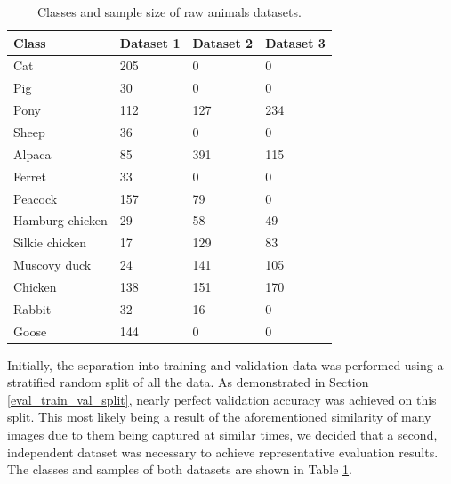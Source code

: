 \documentclass{l4proj}
\begin{document}
\begin{table}[ht]
  \centering
  \begin{tabular}{@{}llll@{}}
    \toprule
    \textbf{Class}  & \textbf{Dataset 1} & \textbf{Dataset 2} & \textbf{Dataset 3}  \\ \midrule
    Cat             & 205              & 0                    & 0                   \\ 
    Pig             & 30               & 0                    & 0                   \\
    Pony            & 112              & 127                  & 234                 \\
    Sheep           & 36               & 0                    & 0                   \\
    Alpaca          & 85               & 391                  & 115                 \\
    Ferret          & 33               & 0                    & 0                   \\
    Peacock         & 157              & 79                   & 0                   \\
    Hamburg chicken & 29               & 58                   & 49                  \\
    Silkie chicken  & 17               & 129                  & 83                  \\
    Muscovy duck    & 24               & 141                  & 105                 \\
    Chicken         & 138              & 151                  & 170                 \\
    Rabbit          & 32               & 16                   & 0                   \\
    Goose           & 144              & 0                    & 0                   \\ \bottomrule
  \end{tabular}
  \caption{Classes and sample size of raw animals datasets.}
  \label{table:raw_dataset}
\end{table}

Initially, the separation into training and validation data was performed using a stratified random split of all the data. As demonstrated in Section \ref{eval_train_val_split}, nearly perfect validation accuracy was achieved on this split. This most likely being a result of the aforementioned similarity of many images due to them being captured at similar times, we decided that a second, independent dataset was necessary to achieve representative evaluation results. The classes and samples of both datasets are shown in Table \ref{table:raw_dataset}.
\end{document}

